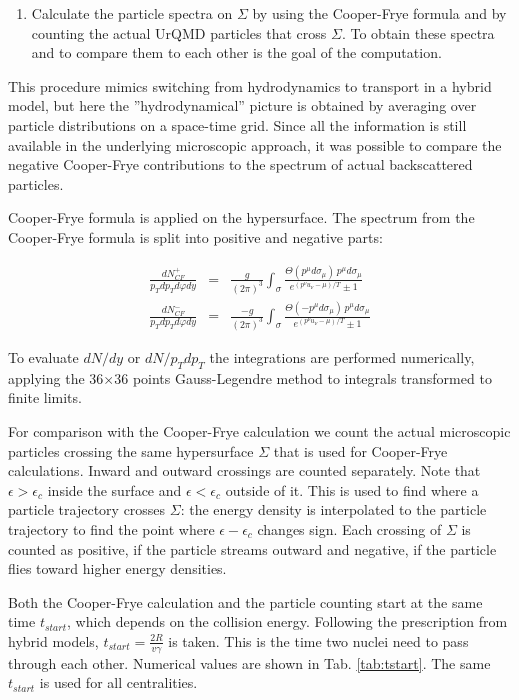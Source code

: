 \begin{enumerate}
\item Calculate the particle spectra on $\Sigma$ by using the
  Cooper-Frye formula and by counting the actual UrQMD particles that
  cross $\Sigma$.  To obtain these spectra and to compare them to each
  other is the goal of the computation.

\end{enumerate}

This procedure mimics switching from hydrodynamics to transport in a
hybrid model, but here the ''hydrodynamical'' picture is obtained by
averaging over particle distributions on a space-time grid. Since all
the information is still available in the underlying microscopic
approach, it was possible to compare the negative Cooper-Frye contributions
to the spectrum of actual backscattered particles.

Cooper-Frye formula is applied on the hypersurface. The spectrum from
the Cooper-Frye formula is split into positive and negative parts:

\begin{eqnarray}
\label{Eq:CFdef1}
\frac{dN^{+}_{CF}}{p_T dp_T d\varphi dy }
  & = & \frac{g}{(2\pi)^3}
         \int_{\sigma}\frac{\Theta(p^{\mu}d\sigma_{\mu}) \, p^{\mu}d\sigma_{\mu}}
         {e^{(p^{\nu}u_{\nu}-\mu)/T} \pm 1} \\
\label{Eq:CFdef2}
\frac{dN^{-}_{CF}}{p_T dp_T d\varphi dy }
  & = & \frac{-g}{(2\pi)^3}
         \int_{\sigma}\frac{\Theta(-p^{\mu}d\sigma_{\mu}) \,p^{\mu}d\sigma_{\mu} }
         {e^{(p^{\nu}u_{\nu}-\mu)/T} \pm 1}
\end{eqnarray}

To evaluate $dN/dy$ or $dN/p_T dp_T$ the integrations are performed
numerically, applying the 36$\times$36 points Gauss-Legendre method to
integrals transformed to finite limits.

For comparison with the Cooper-Frye calculation we count the actual microscopic
particles crossing the same hypersurface $\Sigma$ that is used for Cooper-Frye
calculations. Inward and outward crossings are counted separately. Note that
$\epsilon > \epsilon_c$ inside the surface and $\epsilon < \epsilon_c$ outside
of it. This is used to find where a particle trajectory crosses $\Sigma$: the
energy density is interpolated to the particle trajectory to find the point
where $\epsilon - \epsilon_c$ changes sign.  Each crossing of $\Sigma$ is
counted as positive, if the particle streams outward and negative, if the
particle flies toward higher energy densities.

Both the Cooper-Frye calculation and the particle counting start at the same time
$t_{start}$, which depends on the collision energy. Following the prescription
from hybrid models, $t_{start} = \frac{2R}{v\gamma}$ is taken.  This is the
time two nuclei need to pass through each other. Numerical values are shown in
Tab. \ref{tab:tstart}. The same $t_{start}$ is used for all centralities.

